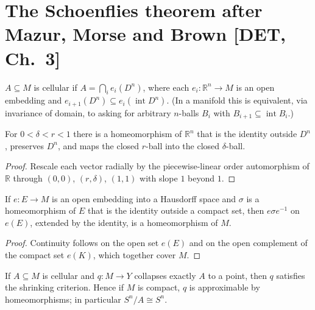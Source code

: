 \section{The Schoenflies theorem after Mazur, Morse and Brown [DET, Ch.~3]}

\begin{definition}
  \label{def:cellular}
  \leanok
  $A \subseteq M$ is cellular if $A = \bigcap_i e_i(D^n)$, where each
  $e_i\colon \mathbb{R}^n \to M$ is an open embedding and
  $e_{i+1}(D^n) \subseteq e_i(\operatorname{int} D^n)$. (In a manifold this is
  equivalent, via invariance of domain, to asking for arbitrary $n$-balls $B_i$
  with $B_{i+1}\subseteq \operatorname{int} B_i$.)
\end{definition}

\begin{lemma}
  \label{lem:squeeze}
  \leanok
  For $0<\delta<r<1$ there is a homeomorphism of $\mathbb{R}^n$ that is the
  identity outside $D^n$, preserves $D^n$, and maps the closed $r$-ball into the
  closed $\delta$-ball.
\end{lemma}

\begin{proof}
  \leanok
  Rescale each vector radially by the piecewise-linear order automorphism of
  $\mathbb{R}$ through $(0,0)$, $(r,\delta)$, $(1,1)$ with slope $1$ beyond $1$.
\end{proof}

\begin{lemma}[Transplanting]
  \label{lem:transplant}
  \leanok
  If $e\colon E\to M$ is an open embedding into a Hausdorff space and $\sigma$ is a
  homeomorphism of $E$ that is the identity outside a compact set, then
  $e\sigma e^{-1}$ on $e(E)$, extended by the identity, is a homeomorphism of $M$.
\end{lemma}

\begin{proof}
  \leanok
  Continuity follows on the open set $e(E)$ and on the open complement of the
  compact set $e(K)$, which together cover $M$.
\end{proof}

\begin{theorem}
  \label{thm:cellular-shrink}
  \leanok
  If $A \subseteq M$ is cellular and $q\colon M \to Y$ collapses exactly $A$ to a
  point, then $q$ satisfies the shrinking criterion. Hence if $M$ is compact, $q$ is
  approximable by homeomorphisms; in particular $S^n/A \cong S^n$.
\end{theorem}

